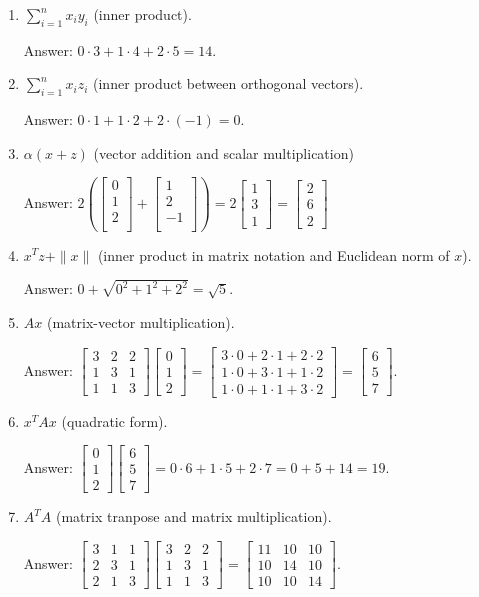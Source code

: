 \documentclass{article}
\def\ans#1{\par\gre{Answer: #1}}
\def\gre#1{{\color{gre}#1}}
\def\norm#1{\|#1\|}
\newcommand{\mat}[1]{\begin{bmatrix}#1\end{bmatrix}}
\def\enum#1{\begin{enumerate}#1\end{enumerate}}
\begin{document}
	\enum{
		\item $\sum_{i=1}^n x_iy_i$ (inner product).
		\ans{$0\cdot3 + 1\cdot 4 + 2\cdot5 = 14$.}
		\item $\sum_{i=1}^n x_iz_i$ (inner product between orthogonal vectors).
		\ans{$0\cdot1 + 1\cdot2 + 2\cdot(-1) = 0$.}
		\item $\alpha(x+z)$ (vector addition and scalar multiplication)
		\ans{$2\left(\left[\begin{array}{c}
				0\\
				1\\
				2\\
			\end{array}\right] + \left[\begin{array}{c}
				1\\
				2\\
				-1\\
			\end{array}\right]\right) = 2\left[\begin{array}{c}1\\3\\1\end{array}\right] = \left[\begin{array}{c}2\\6\\2\end{array}\right]$}
		\item $x^Tz + \norm{x}$ (inner product in matrix notation and Euclidean norm of $x$).
		\ans{$0 + \sqrt{0^2 + 1^2 + 2^2} = \sqrt{5}$.}
		\item $Ax$ (matrix-vector multiplication).
		\ans{$\mat{3 & 2 & 2\\
				1 & 3 & 1\\
				1 & 1 & 3}\mat{0\\1\\2} = \mat{3\cdot0 + 2\cdot1 + 2\cdot2\\1\cdot0 + 3\cdot1 + 1\cdot2\\1\cdot0 + 1\cdot1 + 3\cdot2} = \mat{6\\5\\7}$.}
		\item $x^TAx$ (quadratic form).
		\ans{$\mat{0\\1\\2} \mat{6\\5\\7} = 0\cdot 6 + 1\cdot 5 + 2\cdot 7 = 0 + 5 + 14 = 19$.}
		\item $A^TA$ (matrix tranpose and matrix multiplication).
		\ans{$\mat{3 & 1 & 1\\
				2 & 3 & 1\\
				2 & 1 & 3}\mat{3 & 2 & 2\\
				1 & 3 & 1\\
				1 & 1 & 3} = \mat{11 & 10 & 10\\10 & 14 & 10\\10 & 10 & 14}$.}
	}
	
\end{document}
